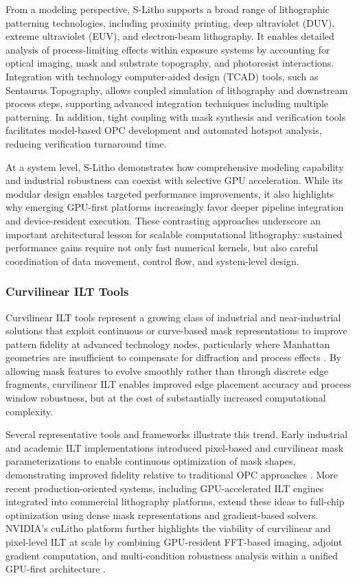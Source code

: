 \documentclass[pdflatex,sn-mathphys-num]{sn-jnl}%
\theoremstyle{thmstyleone}%
\theoremstyle{thmstyletwo}%
\theoremstyle{thmstylethree}%
\begin{document}
From a modeling perspective, S-Litho supports a broad range of lithographic patterning technologies, including proximity printing, deep ultraviolet (DUV), extreme ultraviolet (EUV), and electron-beam lithography. It enables detailed analysis of process-limiting effects within exposure systems by accounting for optical imaging, mask and substrate topography, and photoresist interactions. Integration with technology computer-aided design (TCAD) tools, such as Sentaurus Topography, allows coupled simulation of lithography and downstream process steps, supporting advanced integration techniques including multiple patterning. In addition, tight coupling with mask synthesis and verification tools facilitates model-based OPC development and automated hotspot analysis, reducing verification turnaround time.

At a system level, S-Litho demonstrates how comprehensive modeling capability and industrial robustness can coexist with selective GPU acceleration. While its modular design enables targeted performance improvements, it also highlights why emerging GPU-first platforms increasingly favor deeper pipeline integration and device-resident execution. These contrasting approaches underscore an important architectural lesson for scalable computational lithography: sustained performance gains require not only fast numerical kernels, but also careful coordination of data movement, control flow, and system-level design.

\subsubsection{Curvilinear ILT Tools}
Curvilinear ILT tools represent a growing class of industrial and near-industrial solutions that exploit continuous or curve-based mask representations to improve pattern fidelity at advanced technology nodes, particularly where Manhattan geometries are insufficient to compensate for diffraction and process effects \cite{cecil2022advances}. By allowing mask features to evolve smoothly rather than through discrete edge fragments, curvilinear ILT enables improved edge placement accuracy and process window robustness, but at the cost of substantially increased computational complexity.

Several representative tools and frameworks illustrate this trend. Early industrial and academic ILT implementations introduced pixel-based and curvilinear mask parameterizations to enable continuous optimization of mask shapes, demonstrating improved fidelity relative to traditional OPC approaches \cite{Socha66,cecil2022advances}. More recent production-oriented systems, including GPU-accelerated ILT engines integrated into commercial lithography platforms, extend these ideas to full-chip optimization using dense mask representations and gradient-based solvers. NVIDIA’s cuLitho platform further highlights the viability of curvilinear and pixel-level ILT at scale by combining GPU-resident FFT-based imaging, adjoint gradient computation, and multi-condition robustness analysis within a unified GPU-first architecture \cite{Singh}.
\end{document}

